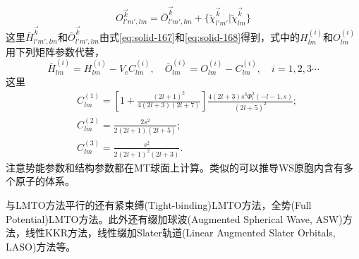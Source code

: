 \begin{equation}
  O_{l'm',lm}^{\vec k}=\bar O_{l'm',lm}^{\vec k}+\{\tilde\chi_{l'm'}^{\vec k}|\tilde\chi_{lm}^{\vec k}\}
  \label{eq:solid-183}
\end{equation}
这里$\bar H_{l'm',lm}^{\vec k}$和$\bar O_{l'm',lm}^{\vec k}$由式\eqref{eq:solid-167}和\eqref{eq:solid-168}得到，式中的$H_{lm}^{(i)}$和$O_{lm}^{(i)}$用下列矩阵参数代替，
$$\bar H_{lm}^{(i)}=H_{lm}^{(i)}-V_cC_{lm}^{(i)},\quad\bar O_{lm}^{(i)}=O_{lm}^{(i)}-C_{lm}^{(i)},\quad i=1,2,3\cdots$$
这里
\begin{equation}
  \begin{split}
    &C_{lm}^{(1)}=\left[1+\frac{(2l+1)^2}{4(2l+3)(2l+7)}\right]\frac{4(2l+3)s^3\Phi_l^2(-l-1,s)}{(2l+5)^2};\\
    &C_{lm}^{(2)}=\frac{2s^2}{2(2l+1)(2l+5)};\\
    &C_{lm}^{(3)}=\frac{s^2}{2(2l+1)^2(2l+3)}.
  \end{split}
  \label{eq:solid-184}
\end{equation}
注意势能参数和结构参数都在MT球面上计算。类似的可以推导WS原胞内含有多个原子的体系\cite{Nemoshkalenko-Antonov}。

与LMTO方法平行的还有紧束缚(Tight-binding)LMTO方法\cite{Andersen-Jepsen,PRL53-2571_1984}，全势(Full Potential)LMTO方法\cite{PRB37-10269_1988,Blochel,JCP87-7125_1987,PRB38-1537_1988,PRB46-12181_1992}。此外还有缀加球波(Augmented Spherical Wave, ASW)方法\cite{PRB19-6094_1979}，线性KKR方法\cite{JPC5-97_1972,Wonn,Ziesche-Lehmann,PSSB97-449_1980}，线性缀加Slater轨道(Linear Augmented Slater Orbitals, LASO)方法\cite{PRB29-2896_1984}等。

